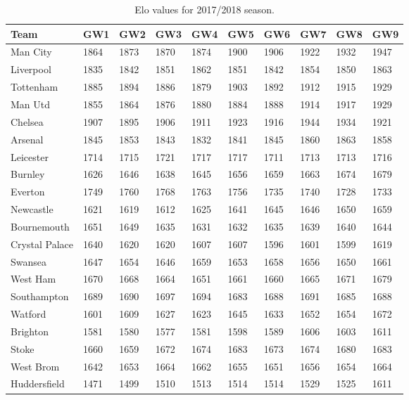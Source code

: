\begin{table}[H]
\centering
\smaller
\caption{Elo values for 2017/2018 season.}
\label{my-label}
\begin{tabular}{|l|l|l|l|l|l|l|l|l|l|}
\hline
Team           & GW1  & GW2  & GW3  & GW4  & GW5  & GW6  & GW7  & GW8  & GW9   \\
\hline
Man City       & 1864 & 1873 & 1870 & 1874 & 1900 & 1906 & 1922 & 1932 & 1947  \\
Liverpool      & 1835 & 1842 & 1851 & 1862 & 1851 & 1842 & 1854 & 1850 & 1863  \\
Tottenham      & 1885 & 1894 & 1886 & 1879 & 1903 & 1892 & 1912 & 1915 & 1929  \\
Man Utd        & 1855 & 1864 & 1876 & 1880 & 1884 & 1888 & 1914 & 1917 & 1929  \\
Chelsea        & 1907 & 1895 & 1906 & 1911 & 1923 & 1916 & 1944 & 1934 & 1921  \\
Arsenal        & 1845 & 1853 & 1843 & 1832 & 1841 & 1845 & 1860 & 1863 & 1858  \\
Leicester      & 1714 & 1715 & 1721 & 1717 & 1717 & 1711 & 1713 & 1713 & 1716  \\
Burnley        & 1626 & 1646 & 1638 & 1645 & 1656 & 1659 & 1663 & 1674 & 1679  \\
Everton        & 1749 & 1760 & 1768 & 1763 & 1756 & 1735 & 1740 & 1728 & 1733  \\
Newcastle      & 1621 & 1619 & 1612 & 1625 & 1641 & 1645 & 1646 & 1650 & 1659  \\
Bournemouth    & 1651 & 1649 & 1635 & 1631 & 1632 & 1635 & 1639 & 1640 & 1644  \\
Crystal Palace & 1640 & 1620 & 1620 & 1607 & 1607 & 1596 & 1601 & 1599 & 1619  \\
Swansea        & 1647 & 1654 & 1646 & 1659 & 1653 & 1658 & 1656 & 1650 & 1661  \\
West Ham       & 1670 & 1668 & 1664 & 1651 & 1661 & 1660 & 1665 & 1671 & 1679  \\
Southampton    & 1689 & 1690 & 1697 & 1694 & 1683 & 1688 & 1691 & 1685 & 1688  \\
Watford        & 1601 & 1609 & 1627 & 1623 & 1645 & 1633 & 1652 & 1654 & 1672  \\
Brighton       & 1581 & 1580 & 1577 & 1581 & 1598 & 1589 & 1606 & 1603 & 1611  \\
Stoke          & 1660 & 1659 & 1672 & 1674 & 1683 & 1673 & 1674 & 1680 & 1683  \\
West Brom      & 1642 & 1653 & 1664 & 1662 & 1655 & 1651 & 1656 & 1654 & 1664  \\
Huddersfield   & 1471 & 1499 & 1510 & 1513 & 1514 & 1514 & 1529 & 1525 & 1611  \\
\hline
\end{tabular}
\end{table}



